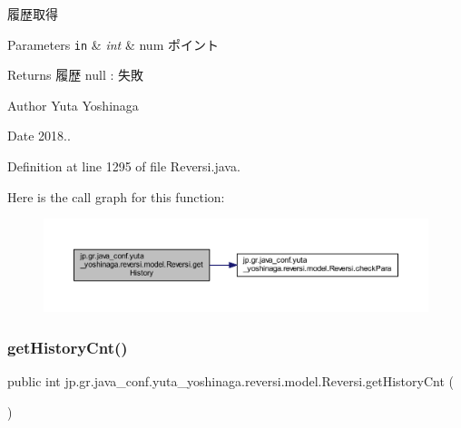 履歴取得 


\begin{DoxyParams}[1]{Parameters}
\mbox{\tt in}  & {\em int} & num ポイント \\
\hline
\end{DoxyParams}
\begin{DoxyReturn}{Returns}
履歴 null \+: 失敗 
\end{DoxyReturn}
\begin{DoxyAuthor}{Author}
Yuta Yoshinaga 
\end{DoxyAuthor}
\begin{DoxyDate}{Date}
2018.. 
\end{DoxyDate}


Definition at line 1295 of file Reversi.\+java.

Here is the call graph for this function\+:\nopagebreak
\begin{figure}[H]
\begin{center}
\leavevmode
\includegraphics[width=350pt]{classjp_1_1gr_1_1java__conf_1_1yuta__yoshinaga_1_1reversi_1_1model_1_1_reversi_af781f5ebb4fb33b574ec58acfb45a796_cgraph}
\end{center}
\end{figure}
\mbox{\label{classjp_1_1gr_1_1java__conf_1_1yuta__yoshinaga_1_1reversi_1_1model_1_1_reversi_a286949e070d0cfc8a1d9562a298b7b98}} 
\subsubsection{\texorpdfstring{get\+History\+Cnt()}{getHistoryCnt()}}
{\footnotesize\ttfamily public int jp.\+gr.\+java\+\_\+conf.\+yuta\+\_\+yoshinaga.\+reversi.\+model.\+Reversi.\+get\+History\+Cnt (\begin{DoxyParamCaption}{ }\end{DoxyParamCaption})}



